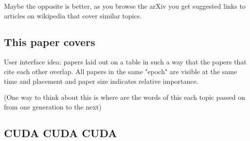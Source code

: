 \documentclass[11pt]{article}
\begin{document}
        Maybe the opposite is better, as you browse the arXiv you get suggested
        links to articles on wikipedia that cover similar topics.




	
	\subsection{This paper covers}
	
		User interface idea: papers laid out on a table in such a way that the papers that
		cite each other overlap. All papers in the same "epoch" are visible at the same time
		and placement and paper size indicates relative importance.
		
		(One way to think about this is where are the words of this each topic passed on from one generation
		to the next)
		 
		
	\subsection{CUDA CUDA CUDA}
				




\end{document}

